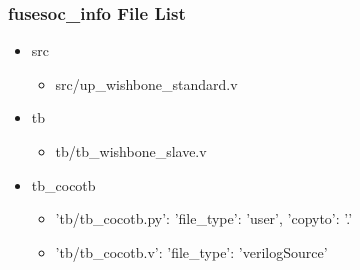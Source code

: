 \subsubsection{fusesoc\_info File List}
\begin{itemize}
\item src
	\begin{itemize}
	\item src/up\_wishbone\_standard.v
	\end{itemize}
\item tb
	\begin{itemize}
	\item tb/tb\_wishbone\_slave.v
	\end{itemize}
\item tb\_cocotb
	\begin{itemize}
	\item {'tb/tb\_cocotb.py': {'file\_type': 'user', 'copyto': '.'}}
	\item {'tb/tb\_cocotb.v': {'file\_type': 'verilogSource'}}
	\end{itemize}
\end{itemize}
